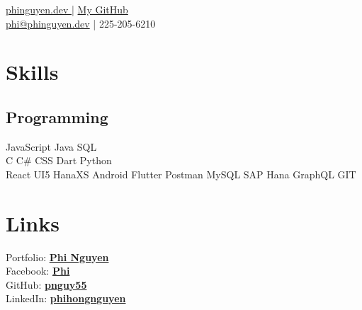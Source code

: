 \documentclass[]{deedy-resume-openfont}
\begin{document}
%
%
\lastupdated

%
%
{ \href{https://phinguyen.dev}{phinguyen.dev }| \href{https://github.com/pnguy55}{ My GitHub}\\
\href{mailto:phi@phinguyen.dev}{phi@phinguyen.dev} | 225-205-6210
}

%
%

\begin{minipage}[t]{0.33\textwidth} 


\section{Skills}
\subsection{Programming}
JavaScript \textbullet{}   Java \textbullet{} SQL\\
C \textbullet{} C\# \textbullet{} CSS \textbullet{} Dart \textbullet{} Python \\
React \textbullet{} UI5 \textbullet{} HanaXS \textbullet{} Android \textbullet{} Flutter \textbullet{} Postman \textbullet{} MySQL \textbullet{} SAP Hana \textbullet{} GraphQL \textbullet{} GIT
\sectionsep



\section{Links} 
Portfolio: \href{https://phinguyen.dev}{\bf Phi Nguyen} \\
Facebook: \href{https://www.facebook.com/phiphresh}{\bf Phi} \\
GitHub: \href{https://github.com/pnguy55}{\bf pnguy55}\\
LinkedIn:  \href{https://www.linkedin.com/in/phihongnguyen/}{\bf phihongnguyen} \\


\end{minipage}
\end{document}
